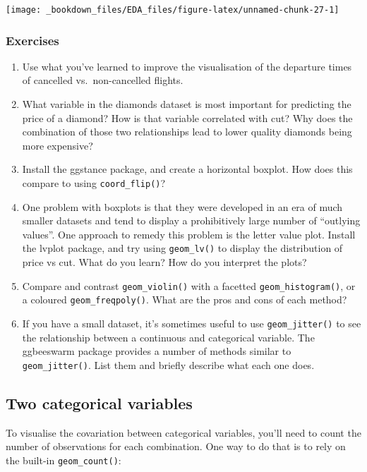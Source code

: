 \documentclass[]{book}
\begin{document}
\begin{center}\texttt{[image: \_bookdown\_files/EDA\_files/figure-latex/unnamed-chunk-27-1]} \end{center}

\subsubsection{Exercises}\label{exercises-15}

\begin{enumerate}
\def\labelenumi{\arabic{enumi}.}
\item
  Use what you've learned to improve the visualisation of the departure
  times of cancelled vs.~non-cancelled flights.
\item
  What variable in the diamonds dataset is most important for predicting
  the price of a diamond? How is that variable correlated with cut? Why
  does the combination of those two relationships lead to lower quality
  diamonds being more expensive?
\item
  Install the ggstance package, and create a horizontal boxplot. How
  does this compare to using \texttt{coord\_flip()}?
\item
  One problem with boxplots is that they were developed in an era of
  much smaller datasets and tend to display a prohibitively large number
  of ``outlying values''. One approach to remedy this problem is the
  letter value plot. Install the lvplot package, and try using
  \texttt{geom\_lv()} to display the distribution of price vs cut. What
  do you learn? How do you interpret the plots?
\item
  Compare and contrast \texttt{geom\_violin()} with a facetted
  \texttt{geom\_histogram()}, or a coloured \texttt{geom\_freqpoly()}.
  What are the pros and cons of each method?
\item
  If you have a small dataset, it's sometimes useful to use
  \texttt{geom\_jitter()} to see the relationship between a continuous
  and categorical variable. The ggbeeswarm package provides a number of
  methods similar to \texttt{geom\_jitter()}. List them and briefly
  describe what each one does.
\end{enumerate}

\subsection{Two categorical variables}\label{two-categorical-variables}

To visualise the covariation between categorical variables, you'll need
to count the number of observations for each combination. One way to do
that is to rely on the built-in \texttt{geom\_count()}:
\end{document}
